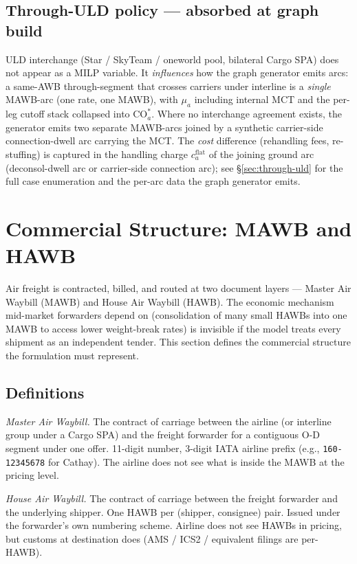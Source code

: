 \documentclass[11pt,a4paper]{article}
\theoremstyle{definition}
\begin{document}
\subsection{Through-ULD policy --- absorbed at graph build}
\label{sec:through-uld-graph}

ULD interchange (Star / SkyTeam / oneworld pool, bilateral Cargo SPA) does not
appear as a MILP variable. It \emph{influences} how the graph generator emits
arcs: a same-AWB through-segment that crosses carriers under interline is a
\emph{single} MAWB-arc (one rate, one MAWB), with $\mu_a$ including internal
MCT and the per-leg cutoff stack collapsed into $\text{CO}_a^*$. Where no
interchange agreement exists, the generator emits two separate MAWB-arcs
joined by a synthetic carrier-side connection-dwell arc carrying the MCT. The
\emph{cost} difference (rehandling fees, re-stuffing) is captured in the
handling charge $c_a^{\text{flat}}$ of the joining ground arc (deconsol-dwell
arc or carrier-side connection arc); see \S\ref{sec:through-uld} for the
full case enumeration and the per-arc data the graph generator emits.

\section{Commercial Structure: MAWB and HAWB}
\label{sec:mawb-hawb}

Air freight is contracted, billed, and routed at two document layers ---
Master Air Waybill (MAWB) and House Air Waybill (HAWB). The economic mechanism
mid-market forwarders depend on (consolidation of many small HAWBs into one
MAWB to access lower weight-break rates) is invisible if the model treats every
shipment as an independent tender. This section defines the commercial
structure the formulation must represent.

\subsection{Definitions}

\begin{description}[leftmargin=2cm, labelwidth=1.8cm, style=nextline]
  \item[MAWB] \emph{Master Air Waybill.} The contract of carriage between the
        airline (or interline group under a Cargo SPA) and the freight
        forwarder for a contiguous O-D segment under one offer. 11-digit
        number, 3-digit IATA airline prefix (e.g., \texttt{160-12345678} for
        Cathay). The airline does not see what is inside the MAWB at the
        pricing level.
  \item[HAWB] \emph{House Air Waybill.} The contract of carriage between the
        freight forwarder and the underlying shipper. One HAWB per (shipper,
        consignee) pair. Issued under the forwarder's own numbering scheme.
        Airline does not see HAWBs in pricing, but customs at destination does
        (AMS / ICS2 / equivalent filings are per-HAWB).
\end{description}
\end{document}
